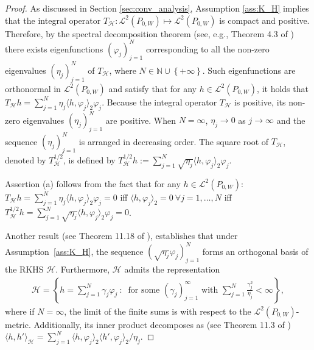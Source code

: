 \documentclass[twoside,11pt]{article}
\newcommand{\mc}{\mathcal}
\begin{document}
\begin{proof}
As discussed in Section \ref{sec:conv_analysis}, Assumption \ref{ass:K_H} implies that the integral operator $T_\mc{H}:\mc{L}^2(P_{0,W})\mapsto\mc{L}^2(P_{0,W})$ is compact and positive. Therefore, by the spectral decomposition theorem (see, e.g., Theorem 4.3 of \cite{hohage2002lecture}) there exists eigenfunctions $(\varphi_j)_{j=1}^N$ corresponding to all the non-zero eigenvalues $ (\eta_j)_{j=1}^N$ of $T_{\mc{H}}$, where $N\in\mathbb{N}\cup\left\{+\infty\right\}$. Such eigenfunctions are orthonormal in $\mathcal{L}^2(P_{0,W})$ and satisfy that for any $h \in \mathcal{L}^2(P_{0,W})$, it holds that $T_{\mc{H}}h=\sum_{j=1}^N\eta_j\langle h,\varphi_j\rangle_2\varphi_j$. Because the integral operator $T_\mc{H}$ is positive, its non-zero eigenvalues $ (\eta_j)_{j=1}^N$ are positive. When $N=\infty$, $\eta_j \rightarrow 0$  as $j \rightarrow \infty$ and the sequence $ (\eta_j)_{j=1}^N$ is arranged in decreasing order. The square root of $T_{\mc{H}}$, denoted by $T_{\mc{H}}^{1/2}$, is defined by $T_{\mc{H}}^{1/2}h:=\sum_{j=1}^N \sqrt{\eta_j}\langle h,\varphi_j\rangle_2\varphi_j$.

Assertion (a) follows from the fact that for any $h\in\mc{L}^2(P_{0,W})$: $T_{\mc{H}}h=\sum_{j=1}^N\eta_j\langle h,\varphi_j\rangle_2\varphi_j=0$ iff $\langle h,\varphi_j\rangle_2=0\:\forall j=1,\dots,N$ iff $T_{\mc{H}}^{1/2}h=\sum_{j=1}^N\sqrt{\eta_j}\langle h,\varphi_j\rangle_2\varphi_j=0$.

Another result (see Theorem 11.18 of \cite{paulsen2016introduction}), establishes that under Assumption~\ref{ass:K_H}, the sequence $(\sqrt{\eta_j}\varphi_j)_{j=1}^N$ forms an orthogonal basis of the RKHS $\mc{H}$. Furthermore,  $\mc{H}$ admits the representation 
\begin{align}
 \mc{H}=\left\{h=\sum_{j=1}^N\gamma_j\varphi_j \: : \: \text{ for some } (\gamma_j)_{j=1}^{\infty}\text{ with }\sum_{j=1}^N\frac{\gamma_j^2}{\eta_j}<\infty\right\},\label{H_rep}
\end{align}
where if $N=\infty$, the limit of the finite sums is with respect to the $\mathcal{L}^2(P_{0,W})$-metric. 
Additionally, its inner product decomposes as (see Theorem 11.3 of \cite{paulsen2016introduction}) $\langle h,h'\rangle_{\mc{H}}=\sum_{j=1}^N\langle h,\varphi_j\rangle_2\langle h',\varphi_j\rangle_2/\eta_j$.


\end{proof}
\end{document}
